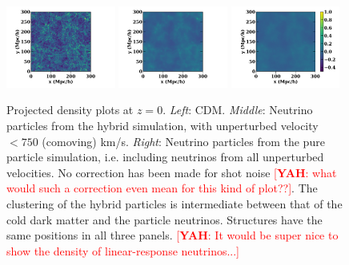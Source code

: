 \documentclass[useAMS, usenatbib]{mnras}
\newcommand{\yah}[1]{{\textcolor{red}{[{\bf YAH}: #1]}}}
\begin{document}
\begin{figure}
\includegraphics[trim={1.5cm 0 1.5cm 0},clip,width=0.32\textwidth]{nuplots/dens-plt-b300p512nu0_4hybt1.pdf}
\includegraphics[trim={1.5cm 0 1.5cm 0},clip, width=0.32\textwidth]{nuplots/dens-plt-b300p512nu0_4hybt2.pdf}
\includegraphics[trim={1.5cm 0 1.5cm 0},clip, width=0.32\textwidth]{nuplots/dens-plt-b300p512nu0_4pt2.pdf}
  \caption{Projected density plots at $z=0$. \emph{Left}: CDM. \emph{Middle}: Neutrino particles from the hybrid simulation, with unperturbed velocity $<750$ (comoving) km/s. \emph{Right}: Neutrino particles from the pure particle simulation, i.e. including neutrinos from all unperturbed velocities. No correction has been made for shot noise \yah{what would such a correction even mean for this kind of plot??}. The clustering of the hybrid particles is intermediate between that of the cold dark matter and the particle neutrinos. Structures have the same positions in all three panels. \yah{It would be super nice to show the density of linear-response neutrinos...}}
  \label{fig:density_plot}
\end{figure}
\end{document}
